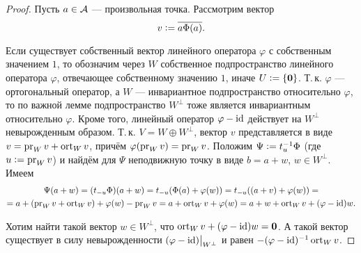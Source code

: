 \begin{proof}
    Пусть $a \in \mathcal{A}$ --- произвольная точка. Рассмотрим вектор
    \[
        v \vcentcolon = \overline{a\Phi(a)}.
    \]

    Если существует собственный вектор линейного оператора $\varphi$ с собственным значением $1$, то обозначим через $W$ собственное подпространство линейного оператора $\varphi$, отвечающее собственному значению $1$, иначе $U \vcentcolon = \{\boldsymbol{0}\}$. Т.\,к. $\varphi$ --- ортогональный оператор, а $W$ --- инвариантное подпространство относительно $\varphi$, то по важной лемме подпространство $W^\perp$ тоже является инвариантным относительно $\varphi$. Кроме того, линейный оператор $\varphi - \mathrm{id}$ действует на $W^\perp$ невырожденным образом. Т.\,к. $V = W \oplus W^\perp$, вектор $v$ представляется в виде $v = \operatorname{pr}_Wv + \operatorname{ort}_Wv$, причём $\varphi(\operatorname{pr}_Wv) = \operatorname{pr}_Wv$. Положим $\Psi \vcentcolon = t_u^{-1}\Phi$ (где $u \vcentcolon = \operatorname{pr}_Wv$) и найдём для $\Psi$ неподвижную точку в виде $b = a + w$, $w \in W^\perp$. Имеем
    \begin{multline*}
        \Psi(a + w) = (t_{-u}\Phi)(a + w) = t_{-u}(\Phi(a) + \varphi(w)) = t_{-u}((a + v) + \varphi(w)) =\\ = a + (\operatorname{pr}_Wv + \operatorname{ort}_Wv) + \varphi(w) - \operatorname{pr}_Wv = a + \operatorname{ort}_Wv + \varphi(w) = a + w + \operatorname{ort}_Wv + (\varphi - \mathrm{id})w.
    \end{multline*}

    Хотим найти такой вектор $w \in W^\perp$, что $\operatorname{ort}_Wv + (\varphi - \mathrm{id})w = \boldsymbol{0}$. А такой вектор существует в силу невырожденности $(\varphi - \mathrm{id})\big|_{W^\perp}$ и равен $-(\varphi - \mathrm{id})^{-1}\operatorname{ort}_Wv$.
\end{proof}

